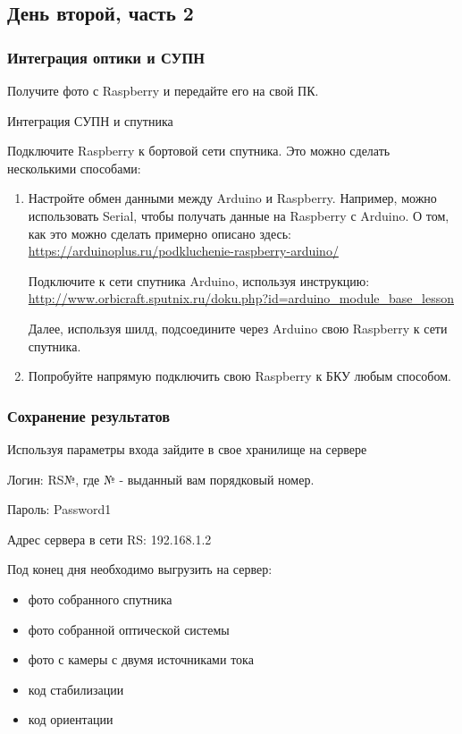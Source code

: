 \subsection*{День второй, часть 2}

\subsubsection*{Интеграция оптики и СУПН}

Получите фото с Raspberry и передайте его на свой ПК.

Интеграция СУПН и спутника

Подключите Raspberry к бортовой сети спутника. Это можно сделать несколькими способами:
\begin{enumerate}
    \item Настройте обмен данными между Arduino и Raspberry. Например, можно использовать Serial, чтобы получать данные на Raspberry с Arduino. О том, как это можно сделать примерно описано здесь: \url{https://arduinoplus.ru/podkluchenie-raspberry-arduino/}
    
    Подключите к сети спутника Arduino, используя инструкцию: \url{http://www.orbicraft.sputnix.ru/doku.php?id=arduino_module_base_lesson}

    Далее, используя шилд, подсоедините через Arduino свою Raspberry к сети спутника.
    \item  Попробуйте напрямую подключить свою Raspberry к БКУ любым способом.
\end{enumerate}

\subsubsection*{Сохранение результатов}

Используя параметры входа зайдите в свое хранилище на сервере

Логин: RS№, где № - выданный вам порядковый номер.

Пароль: Password1

Адрес сервера в сети RS: 192.168.1.2

Под конец дня необходимо выгрузить на сервер:
\begin{itemize}
    \item фото собранного спутника
    \item фото собранной оптической системы
    \item фото с камеры с двумя источниками тока
    \item код стабилизации
    \item код ориентации
\end{itemize}

